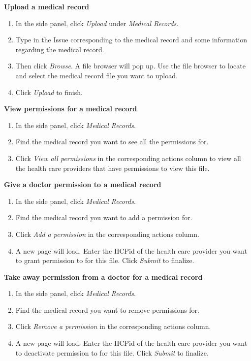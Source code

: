 \documentclass[10pt]{report}
\begin{document}
\textbf{Upload a medical record}
\begin{enumerate}
\item In the side panel, click \textit{Upload} under \textit{Medical Records}.
\item Type in the Issue corresponding to the medical record and some information regarding the medical record.
\item Then click \textit{Browse}. A file browser will pop up. Use the file browser to locate and select the medical record file you want to upload.
\item Click \textit{Upload} to finish.
\end{enumerate}
\textbf{View permissions for a medical record}
\begin{enumerate}
\item In the side panel, click \textit{Medical Records}.
\item Find the medical record you want to see all the permissions for.
\item Click \textit{View all permissions} in the corresponding actions column to view all the health care providers that have permissions to view this file.
\end{enumerate}
\textbf{Give a doctor permission to a medical record}
\begin{enumerate}
\item In the side panel, click \textit{Medical Records}.
\item Find the medical record you want to add a permission for.
\item Click \textit{Add a permission} in the corresponding actions column.
\item A new page will load. Enter the HCPid of the health care provider you want to grant permission to for this file. Click \textit{Submit} to finalize.
\end{enumerate}
\textbf{Take away permission from a doctor for a medical record}
\begin{enumerate}
\item In the side panel, click \textit{Medical Records}.
\item Find the medical record you want to remove permissions for.
\item Click \textit{Remove a permission} in the corresponding actions column.
\item A new page will load. Enter the HCPid of the health care provider you want to deactivate permission to for this file. Click \textit{Submit} to finalize.
\end{enumerate}
\end{document}
